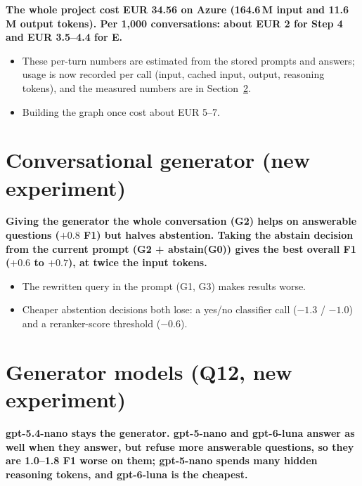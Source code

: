 \documentclass[11pt,a4paper]{article}
\begin{document}
\textbf{The whole project cost EUR 34.56 on Azure (164.6\,M input and 11.6\,M output tokens).
Per 1,000 conversations: about EUR 2 for Step 4 and EUR 3.5--4.4 for E.}

\begin{itemize}
\item These per-turn numbers are estimated from the stored prompts and answers; usage is now
  recorded per call (input, cached input, output, reasoning tokens), and the measured numbers are
  in Section~\ref{sec:models}.
\item Building the graph once cost about EUR 5--7.
\end{itemize}

\section{Conversational generator (new experiment)}\label{sec:conv}

\textbf{Giving the generator the whole conversation (G2) helps on answerable questions ($+0.8$ F1)
but halves abstention. Taking the abstain decision from the current prompt (G2 + abstain(G0))
gives the best overall F1 ($+0.6$ to $+0.7$), at twice the input tokens.}

\begin{itemize}
\item The rewritten query in the prompt (G1, G3) makes results worse.
\item Cheaper abstention decisions both lose: a yes/no classifier call ($-1.3$ / $-1.0$) and a
  reranker-score threshold ($-0.6$).
\end{itemize}

\section{Generator models (Q12, new experiment)}\label{sec:models}

\textbf{gpt-5.4-nano stays the generator. gpt-5-nano and gpt-6-luna answer as well when they
answer, but refuse more answerable questions, so they are 1.0--1.8 F1 worse on them; gpt-5-nano
spends many hidden reasoning tokens, and gpt-6-luna is the cheapest.}
\end{document}
